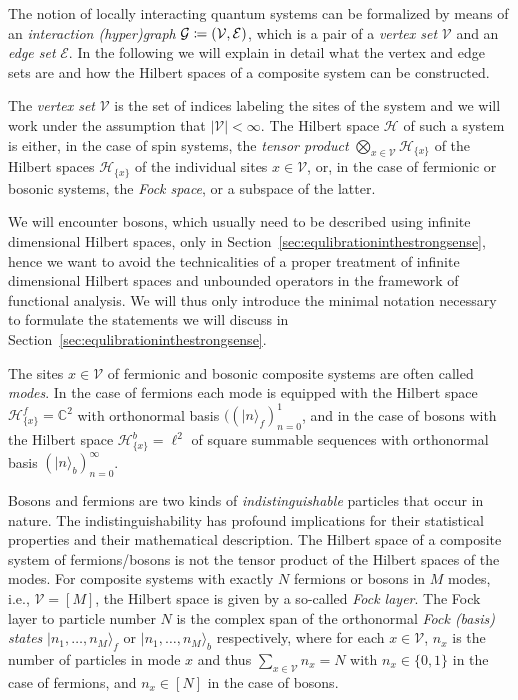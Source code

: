 \documentclass[a4paper,12pt,listof=totoc,index=totoc,bibliography=totoc,headsepline=false,headings=normal,BCOR16.153846mm,DIV12,headinclude,twoside,cleardoublepage=empty,numbers=noenddot,final]{scrreprt}
\theoremstyle{mystyle}
\numberwithin{equation}{section}
\numberwithin{figure}{section}
\numberwithin{lemma}{section}
\numberwithin{theorem}{section}
\numberwithin{corollary}{section}
\numberwithin{definition}{section}
\numberwithin{conjecture}{section}
\numberwithin{observation}{section}
\newcommand{\+}{\mkern2mu}
\newcommand{\coloneqq}{\mathrel{\vcentcolon\mkern-1.2mu=}} %
\newcommand{\ltwo}{\ell^2}
\newcommand{\Vset}{\mathcal{V}}
\newcommand{\Eset}{\mathcal{E}}
\newcommand{\ket}[1]{|#1\rangle}
\DeclareMathOperator{\1}{\mathds{1}}
\newcommand{\mc}[1]{\mathcal{#1}}
\newcommand{\mcH}{\mc{H}}
\newcommand{\mcG}{\mc{G}}
\newcommand{\mb}[1]{\mathbb{#1}}
\renewcommand{\C}{\mb{C}} %
\begin{document}
The notion of locally interacting quantum systems can be formalized by means of an \emph{interaction (hyper)graph} $\mcG \coloneqq (\Vset, \Eset)$, which is a pair of a \emph{vertex set} $\Vset$ and an \emph{edge set} $\Eset$.
In the following we will explain in detail what the vertex and edge sets are and how the Hilbert spaces of a composite system can be constructed.

The \emph{vertex set} $\Vset$ is the set of indices labeling the sites of the system and we will work under the assumption that $|\Vset| < \infty$.
The Hilbert space $\mcH$ of such a system is either, in the case of spin systems, the \emph{tensor product} $\bigotimes_{x\in\Vset} \mcH_{\{x\}}$ of the Hilbert spaces $\mcH_{\{x\}}$ of the individual sites $x \in \Vset$, or, in the case of fermionic or bosonic systems, the \emph{Fock space}, or a subspace of the latter.

We will encounter bosons, which usually need to be described using infinite dimensional Hilbert spaces, only in Section~\ref{sec:equlibrationinthestrongsense}, hence we want to avoid the technicalities of a proper treatment of infinite dimensional Hilbert spaces and unbounded operators in the framework of functional analysis.
We will thus only introduce the minimal notation necessary to formulate the statements we will discuss in Section~\ref{sec:equlibrationinthestrongsense}.

The sites $x \in \Vset$ of fermionic and bosonic composite systems are often called \emph{modes}.
In the case of fermions each mode is equipped with the Hilbert space $\mcH^f_{\{x\}} = \C^2$ with orthonormal basis $((\ket n_f)_{n=0}^1$, and in the case of bosons with the Hilbert space $\mcH^b_{\{x\}} = \ltwo$ of square summable sequences with orthonormal basis $(\ket n_b)_{n=0}^\infty$.

Bosons and fermions are two kinds of \emph{indistinguishable} particles that occur in nature.
The indistinguishability has profound implications for their statistical properties and their mathematical description.
The Hilbert space of a composite system of fermions/bosons is not the tensor product of the Hilbert spaces of the modes.
For composite systems with exactly $N$ fermions or bosons in $M$ modes, i.e., $\Vset = [M]$, the Hilbert space is given by a so-called \emph{Fock layer}.
The Fock layer to particle number $N$ is the complex span of the orthonormal \emph{Fock (basis) states} $\ket{n_1,\dots,n_M}_f$ or $\ket{n_1,\dots,n_M}_b$ respectively, where for each $x \in \Vset$, $n_x$ is the number of particles in mode $x$ and thus $\sum_{x \in \Vset} n_x = N$ with $n_x \in \{0,1\}$ in the case of fermions, and $n_x \in [N]$ in the case of bosons.
\end{document}
